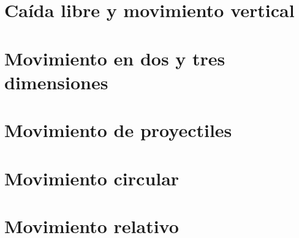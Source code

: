 ﻿\documentclass[11pt,letterpaper,openany]{book}
\newcommand{\rutaraiz}{../..}
\begin{document}




\chapter{Caída libre y movimiento vertical}





\chapter{Movimiento en dos y tres dimensiones}





\chapter{Movimiento de proyectiles}





\chapter{Movimiento circular}





\chapter{Movimiento relativo}
\end{document}
